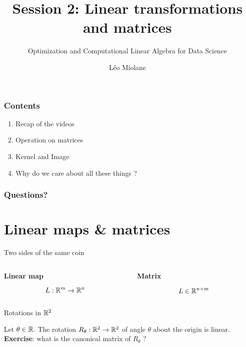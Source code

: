 \documentclass{beamer}
\title{Session 2: Linear transformations and matrices}
\subtitle{Optimization and Computational Linear Algebra for Data Science}
\author{Léo Miolane}
\date{}
\begin{document}
\setcounter{showProgressBar}{0}
\setcounter{showSlideNumbers}{0}

\frame{\titlepage}

\begin{frame}
	\frametitle{Contents}
	\begin{enumerate}
		\item Recap of the videos
		\item Operation on matrices
		\item Kernel and Image
		\item Why do we care about all these things ? 
	\end{enumerate}
\end{frame}


\setcounter{framenumber}{0}
\setcounter{showSlideNumbers}{1}

\begin{frame}[t]
	\frametitle{Questions?}
	\grid
\end{frame}

\section{Linear maps \& matrices}

\begin{frame}[t]{Two sides of the same coin}
	\grid
	\begin{columns}
		\hspace{-0.85cm}
		\begin{column}{0.5\textwidth}
			\vspace{-0.5cm}
			\begin{center}
				\bf Linear map
			\end{center}
			$$
			L: \mathbb{R}^m \to \mathbb{R}^n
			$$
			\vspace{6cm}
		\end{column}
		\vrule
		\begin{column}{0.5\textwidth}
			\vspace{-0.5cm}
			\begin{center}
				\bf Matrix
			\end{center}
			$$
			L \in \mathbb{R}^{n \times m}
			$$
			\vspace{6cm}
		\end{column}
	\end{columns}
	\pause
\end{frame}

\begin{frame}[t]{Rotations in $\mathbb{R}^2$}
	\grid

	\vspace{-0.25cm}
	Let $\theta \in \mathbb{R}$.
	The rotation $R_{\theta}: \mathbb{R}^2 \to \mathbb{R}^2$ of angle $\theta$ about the origin is linear.
	\\
	\textbf{Exercise}: what is the canonical matrix of $R_{\theta}$ ?
\end{frame}
\end{document}
